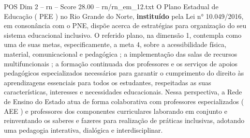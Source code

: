 \begin{textsample}{POS Dim 2 – rn – Score 28.00 – rn/rn\_em\_12.txt}
O Plano Estadual de Educação ( PEE ) no Rio Grande do Norte, \textbf{instituído} pela Lei n{\EmojiFont °} 10.049/2016, em consonância com o PNE, dispõe acerca de estratégias para organização do seu sistema educacional inclusivo.
O referido plano, na dimensão 1, contempla como uma de suas metas, especificamente, a meta 4, sobre a acessibilidade física, material, comunicacional e pedagógica ; a implementação das salas de recursos multifuncionais ; a formação continuada dos professores e os serviços de apoios pedagógicos especializados necessários para garantir o cumprimento do direito às aprendizagens essenciais para todos os estudantes, respeitadas as suas características, interesses e necessidades educacionais.
Nessa perspectiva, a Rede de Ensino do Estado atua de forma colaborativa com professores especializados ( AEE ) e professores dos componentes curriculares laborando em conjunto e reinventando os saberes e fazeres para realização de práticas inclusivas, adotando uma pedagogia interativa, dialógica e interdisciplinar.

\end{textsample}
